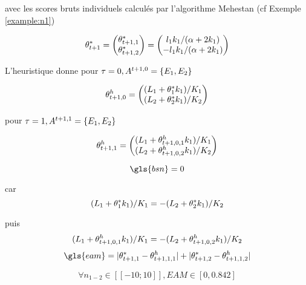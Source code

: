 avec les scores bruts individuels calculés par l'algorithme Mehestan (cf Exemple \ref{example:n1})

\begin{align*}
\theta^*_{t+1}= \begin{pmatrix}
\theta^*_{t+1,1} \\
\theta^*_{t+1,2} 
\end{pmatrix}=
\begin{pmatrix}
l_1k_1 / (\alpha + 2k_1)\\
-l_1k_1 / (\alpha + 2k_1)\\
\end{pmatrix}    
\end{align*}


L'heuristique donne pour $\tau=0, A^{t+1,0}=\left\lbrace E_1,E_2 \right\rbrace$

\begin{equation*}
\theta^h_{t+1,0}= \begin{pmatrix}
(L_1+\theta^*_{1} k_1) / K_1 \\
(L_2+\theta^*_{2} k_1) / K_2
\end{pmatrix}
\end{equation*}

pour $\tau=1, A^{t+1,1}=\left\lbrace E_1,E_2 \right\rbrace$


\begin{equation*}
\theta^h_{t+1,1}= \begin{pmatrix}
(L_1+\theta^h_{t+1,0,1} k_1) / K_1 \\
(L_2+\theta^h_{t+1,0,2} k_1) / K_2
\end{pmatrix}
\end{equation*}

\begin{equation*}
\gls{bsn}=0
\end{equation*}


car  
\begin{equation*}
(L_1+\theta^*_{1} k_1) / K_1 = -(L_2+\theta^*_{2} k_1) / K_2    
\end{equation*}

puis
\begin{align*}
(L_1+\theta^h_{t+1,0,1} k_1) / K_1 = -(L_2+\theta^h_{t+1,0,2} k_1) / K_2    
\end{align*}
\begin{equation*}
\gls{eam}=  |\score_{t+1,1} - \scoreh_{t+1,1,1}|   +  |\score_{t+1,2} - \scoreh_{t+1,1,2}|     
\end{equation*}

\begin{equation*}
\forall{n_{1-2}}\in [\![-10;10]\!], EAM \in [0,0.842]
\end{equation*}

